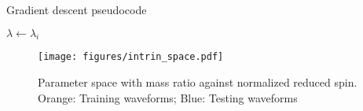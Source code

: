 \documentclass[twocolumn]{aastex631}
\begin{document}
\begin{algorithm}[t]
	\caption{Gradient descent pseudocode}
	\label{alg:gradient}
	    $\lambda\leftarrow\lambda_i$\\
	 \Return{$\lambda$}
\end{algorithm}

\begin{figure}[t]
	\centering
	\texttt{[image: figures/intrin\_space.pdf]}
	\caption{Parameter space with mass ratio against normalized reduced spin. Orange: Training waveforms; Blue: Testing waveforms}
	\label{fig:intrin_space}
\end{figure}
\end{document}
